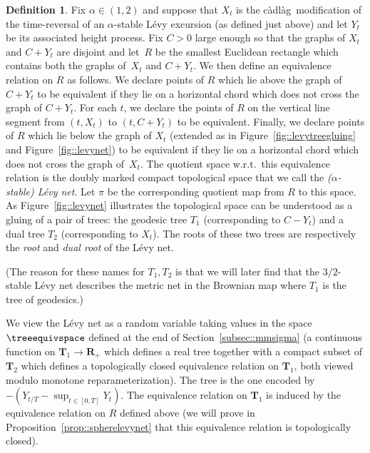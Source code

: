 \documentclass[10pt]{amsart}
\theoremstyle{plain}
\numberwithin{theorem}{section}
\theoremstyle{definition}
\newtheorem{definition}[theorem]{Definition}
\newcommand{\R}{\mathbf{R}}
\newcommand{\T}{\mathbf{T}}
\newcommand{\cadlag}{càdlàg}
\begin{document}
\begin{definition}
\label{def::levynet}
Fix $\alpha \in (1,2)$ and suppose that $X_t$ is the \cadlag\ modification of the time-reversal of an $\alpha$-stable Lévy excursion (as defined just above) and let $Y_t$ be its associated height process. Fix $C > 0$ large enough so that the graphs of $X_t$ and $C+Y_t$ are disjoint and let~$R$ be the smallest Euclidean rectangle which contains both the graphs of~$X_t$ and $C+Y_t$. We then define an equivalence relation on $R$ as follows. We declare points of $R$ which lie above the graph of $C+Y_t$ to be equivalent if they lie on a horizontal chord which does not cross the graph of $C+Y_t$. For each $t$, we declare the points of $R$ on the vertical line segment from $(t,X_t)$ to $(t,C+Y_t)$ to be equivalent. Finally, we declare points of $R$ which lie below the graph of $X_t$ (extended as in Figure~\ref{fig::levytreegluing} and Figure~\ref{fig::levynet}) to be equivalent if they lie on a horizontal chord which does not cross the graph of~$X_t$. The quotient space w.r.t.\ this equivalence relation is the doubly marked compact topological space that we call the \emph{($\alpha$-stable) Lévy net}. Let $\pi$ be the corresponding quotient map from $R$ to this space. As Figure~\ref{fig::levynet} illustrates the topological space can be understood as a gluing of a pair of trees: the geodesic tree $T_1$ (corresponding to $C-Y_t$) and a dual tree $T_2$ (corresponding to $X_t$). The roots of these two trees are respectively the \emph{root} and \emph{dual root} of the Lévy net.

(The reason for these names for $T_1,T_2$ is that we will later find that the $3/2$-stable Lévy net describes the metric net in the Brownian map where $T_1$ is the tree of geodesics.)

We view the Lévy net as a random variable taking values in the space $\treeequivspace$ defined at the end of Section~\ref{subsec::mmsigma} (\ie a continuous function on $\T_1 \to \R_+$ which defines a real tree together with a compact subset of $\T_2$ which defines a topologically closed equivalence relation on $\T_1$, both viewed modulo monotone reparameterization). The tree is the one encoded by $-(Y_{t/T} - \sup_{t \in [0,T]} Y_t)$. The equivalence relation on $\T_1$ is induced by the equivalence relation on $R$ defined above (we will prove in Proposition~\ref{prop::spherelevynet} that this equivalence relation is topologically closed).


\end{definition}
\end{document}
